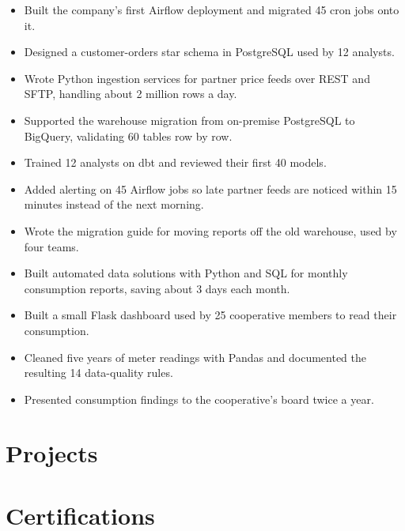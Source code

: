\documentclass[11pt,a4paper,sans]{moderncv}
\begin{document}
\begin{itemize}
\item Built the company's first Airflow deployment and migrated 45 cron jobs onto it.
\item Designed a customer-orders star schema in PostgreSQL used by 12 analysts.
\item Wrote Python ingestion services for partner price feeds over REST and SFTP, handling about 2 million rows a day.
\item Supported the warehouse migration from on-premise PostgreSQL to BigQuery, validating 60 tables row by row.
\item Trained 12 analysts on dbt and reviewed their first 40 models.
\item Added alerting on 45 Airflow jobs so late partner feeds are noticed within 15 minutes instead of the next morning.
\item Wrote the migration guide for moving reports off the old warehouse, used by four teams.
\end{itemize}
\begin{itemize}
\item Built automated data solutions with Python and SQL for monthly consumption reports, saving about 3 days each month.
\item Built a small Flask dashboard used by 25 cooperative members to read their consumption.
\item Cleaned five years of meter readings with Pandas and documented the resulting 14 data-quality rules.
\item Presented consumption findings to the cooperative's board twice a year.
\end{itemize}

\section{Projects}
\section{Certifications}
\end{document}
